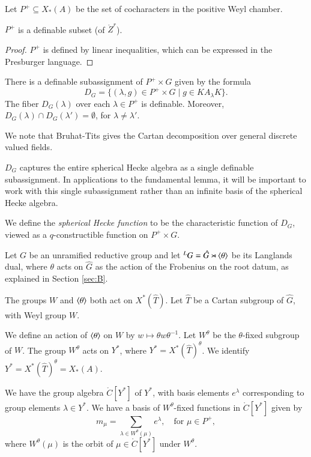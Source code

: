 Let $P^+\subseteq X_*(A)$ be the set of cocharacters in the positive Weyl chamber.

\begin{lemma} $P^+$ is a definable subset (of $\ring{Z}^r$).
\end{lemma}

\begin{proof} $P^+$ is defined by linear inequalities, which can be expressed in the Presburger language.
\end{proof}


\begin{lemma} There is a definable subassignment of $P^+\times G$ given by the formula
\[
D_G = \{(\lambda,g)\in P^+\times G \mid g \in K A_\lambda K \}.
\]
The fiber $D_G(\lambda)$ over each $\lambda\in P^+$ is definable.  Moreover,
$D_G(\lambda)\cap D_G(\lambda') = \emptyset$, for $\lambda\ne \lambda'$.
\end{lemma}


We note that Bruhat-Tits gives the Cartan decomposition over general discrete valued fields.

\begin{remark}   $D_G$ captures the entire spherical Hecke algebra as a single
definable subassignment.  In applications to the fundamental lemma, 
it will be important to work with this single subassignment
rather than an infinite basis of the spherical Hecke algebra.
\end{remark}

We define the {\it spherical Hecke function} to be the characteristic function of $D_G$, viewed as a $q$-constructible function
on $P^+\times G$.

Let $G$ be an unramified reductive group and let ${}^LG = \hat G\rtimes \langle{\theta}\rangle$ be its Langlands dual, where
$\theta$ acts on $\hat G$ as the action of the Frobenius on the root datum, as explained in Section \ref{sec:B}.



The groups $W$ and $\langle{\theta}\rangle$ both act on $X^*(\hat T)$.  
Let $\hat T$ be a Cartan subgroup of $\hat G$, with Weyl group $W$.


We define an action of $\langle{\theta}\rangle$ on $W$ by
$w\mapsto \theta w \theta^{-1}$.  
Let $W^\theta$
be the $\theta$-fixed subgroup of $W$.   
The group $W^\theta$ acts on $Y^*$,  where $Y^* = X^*(\hat T)^\theta$.
We identify $Y^* =X^*(\hat T)^\theta = X_*(A)$.

We have  the group algebra $\ring{C}[Y^*]$ of $Y^*$, with basis elements
$e^\lambda$ corresponding to group elements $\lambda\in Y^*$.
We have a basis of $W^\theta$-fixed functions in $\ring{C}[Y^*]$ given by
\[
m_\mu = \sum_{\lambda\in W^\theta(\mu)} e^\lambda, \quad \text{for }\mu\in P^+,
\]
where $W^\theta(\mu)$ is the orbit of $\mu\in\ring{C}[Y^*]$ under $W^\theta$.

